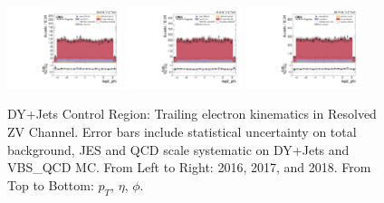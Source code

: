 \begin{figure}[!ht]
  \includegraphics[width=0.30\textwidth]{analysis_plots/2016_zjj/cr_vjets_e/lep2_phi.pdf}
  \includegraphics[width=0.30\textwidth]{analysis_plots/2017_zjj/cr_vjets_e/lep2_phi.pdf}
  \includegraphics[width=0.30\textwidth]{analysis_plots/2018_zjj/cr_vjets_e/lep2_phi.pdf} \\
  \caption[DY+Jets Control Region: Trailing electron kinematics in Resolved ZV Channel]%
  {DY+Jets Control Region: Trailing electron kinematics in Resolved ZV Channel.
    Error bars include statistical uncertainty on total background,
    JES and QCD scale systematic on DY+Jets and VBS\_QCD MC\@. From Left to Right: 2016,
    2017, and 2018. From Top to Bottom: \( p_T \), \( \eta \), \( \phi \).}%
  \label{fig:zjj-cr-vjets-e-lep2-pt-eta-phi}
\end{figure}


